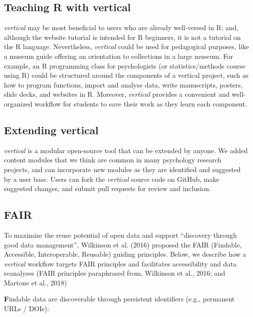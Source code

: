 \documentclass[
  english,
  jou,floatsintext]{apa6}
\begin{document}
\hypertarget{teaching-r-with-vertical}{%
\subsection{Teaching R with vertical}\label{teaching-r-with-vertical}}

\emph{vertical} may be most beneficial to users who are already well-versed in R; and, although the website tutorial is intended for R beginners, it is not a tutorial on the R language. Nevertheless, \emph{vertical} could be used for pedagogical purposes, like a museum guide offering an orientation to collections in a large museum. For example, an R programming class for psychologists (or statistics/methods course using R) could be structured around the components of a vertical project, such as how to program functions, import and analyse data, write manuscripts, posters, slide decks, and websites in R. Moreover, \emph{vertical} provides a convenient and well-organized workflow for students to save their work as they learn each component.

\hypertarget{extending-vertical}{%
\subsection{Extending vertical}\label{extending-vertical}}

\emph{vertical} is a modular open-source tool that can be extended by anyone. We added content modules that we think are common in many psychology research projects, and can incorporate new modules as they are identified and suggested by a user base. Users can fork the \emph{vertical} source code on GitHub, make suggested changes, and submit pull requests for review and inclusion.

\hypertarget{fair}{%
\subsection{FAIR}\label{fair}}

To maximize the reuse potential of open data and support ``discovery through good data management'', Wilkinson et al. (2016) proposed the FAIR (Findable, Accessible, Interoperable, Reusable) guiding principles. Below, we describe how a \emph{vertical} workflow targets FAIR principles and facilitates accessibility and data reanalyses (FAIR principles paraphrased from, Wilkinson et al., 2016; and Martone et al., 2018)

\textbf{F}indable data are discoverable through persistent identifiers (e.g., permanent URLs / DOIs):
\end{document}
